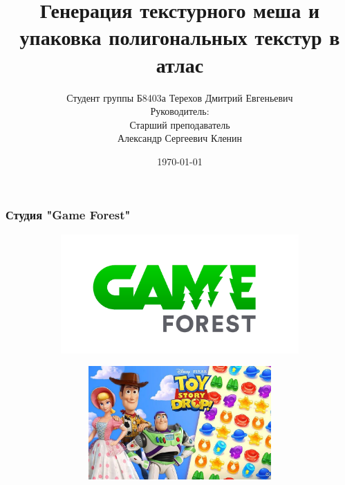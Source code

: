\documentclass[10pt, unicode]{beamer}
\title{Генерация текстурного меша и упаковка полигональных текстур в атлас}
\author[Терехов Д.Е.]{Студент группы Б8403а Терехов Дмитрий Евгеньевич\\
Руководитель:\\
Старший преподаватель\\
Александр Сергеевич Кленин}
\date{}
\date{\today}
\begin{document}
    \begin{frame}
        \titlepage
        \thispagestyle{empty}
    \end{frame}
    \begin{frame}
        \frametitle{Студия "Game Forest"}
        \begin{figure}[H]
            \centering
            \begin{subfigure}[l]{0.50\linewidth}
                \centering
                \includegraphics[scale=0.15]{GAMEFOREST.png}
            \end{subfigure}
            \begin{subfigure}{0.49\linewidth}
                \begin{subfigure}{\linewidth}
                    \centering
                    \includegraphics[scale=0.15]{TSD4.jpg}
                \end{subfigure}
                \begin{subfigure}{\linewidth}
                    \centering

\end{subfigure}
\end{subfigure}
\end{figure}
\end{frame}
\end{document}
